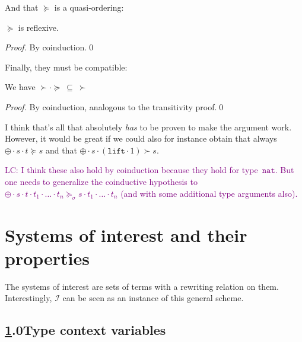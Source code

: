 \documentclass[runningheads,a4paper]{llncs}
\newcommand{\Iterms}{\mathcal{I}}
\newcommand{\app}[2]{#1 \cdot #2}
\newcommand{\nat}{\mathtt{nat}}
\newcommand{\lift}{\mathtt{lift}}
\newcommand{\LC}[1]{\textcolor{purple}{LC: #1}}
\begin{document}
And that $\succeq$ is a quasi-ordering:

\begin{lemma}
$\succeq$ is reflexive.
\end{lemma}

\begin{proof}
  By coinduction.\qed
\end{proof}

Finally, they must be compatible:

\begin{lemma}
We have $\succ \cdot \succeq\ \subseteq\ \succ$
\end{lemma}

\begin{proof}
By coinduction, analogous to the transitivity proof.\qed
\end{proof}

I think that's all that absolutely \emph{has} to be proven to make the
argument work.  However, it would be great if we could also for
instance obtain that always $\app{\app{\oplus}{s}}{t} \succeq s$ and
that $\app{\app{\oplus}{s}}{(\app{\lift}{1})} \succ s$.

\LC{I think these also hold by coinduction because they hold for
type~$\nat$. But one needs to generalize the coinductive hypothesis to
$\app{\app{\oplus}{s}}{t} \cdot t_1 \cdot \ldots \cdot t_n
\succeq_\sigma s \cdot t_1 \cdot \ldots \cdot t_n$ (and with some
additional type arguments also).}

\section{Systems of interest and their properties}\label{sec:systems}

The systems of interest are sets of terms with a rewriting relation on
them.  Interestingly, $\Iterms$ can be seen as an instance of this general
scheme.

\subsection*{\ref{sec:systems}.0\quad Type context variables}
\end{document}
